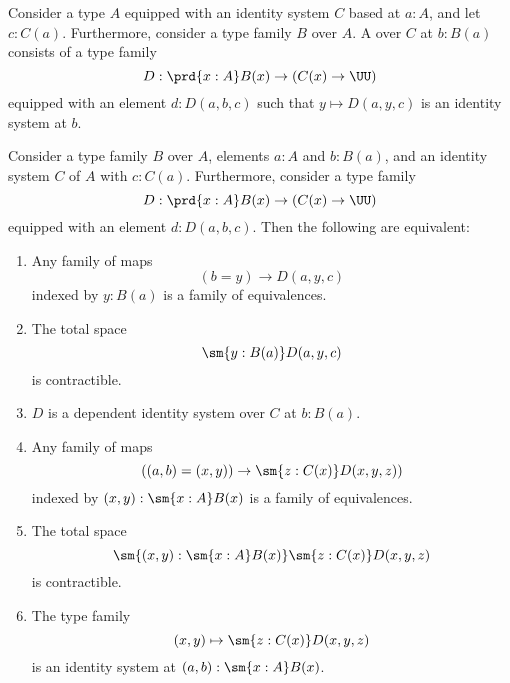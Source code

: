 \begin{defn}
  Consider a type $A$ equipped with an identity system $C$ based at $a:A$, and let $c:C(a)$. Furthermore, consider a type family $B$ over $A$. A  over $C$ at $b:B(a)$ consists of a type family
  \begin{equation*}
    D : \prd{x:A} B(x) \to (C(x)\to \UU)
  \end{equation*}
  equipped with an element $d:D(a,b,c)$ such that $y\mapsto D(a,y,c)$ is an identity system at $b$.
\end{defn}

\begin{thm}\label{thm:structure-identity-principle}
  Consider a type family $B$ over $A$, elements $a:A$ and $b:B(a)$, and an identity system $C$ of $A$ with $c:C(a)$. Furthermore, consider a type family
  \begin{equation*}
    D : \prd{x:A} B(x) \to (C(x)\to \UU)
  \end{equation*}
  equipped with an element $d:D(a,b,c)$. Then the following are equivalent:
  \begin{enumerate}
  \item Any family of maps
    \begin{equation*}
      (b=y)\to D(a,y,c)
    \end{equation*}
    indexed by $y:B(a)$ is a family of equivalences.
  \item The total space
    \begin{equation*}
      \sm{y:B(a)}D(a,y,c)
    \end{equation*}
    is contractible.
  \item $D$ is a dependent identity system over $C$ at $b:B(a)$.
  \item Any family of maps
    \begin{equation*}
      ((a,b)=(x,y))\to \sm{z:C(x)}D(x,y,z))
    \end{equation*}
    indexed by $(x,y):\sm{x:A}B(x)$ is a family of equivalences.
  \item The total space
    \begin{equation*}
      \sm{(x,y):\sm{x:A}B(x)}\sm{z:C(x)}D(x,y,z)
    \end{equation*}
    is contractible.
  \item The type family
    \begin{equation*}
      (x,y)\mapsto \sm{z:C(x)}D(x,y,z)
    \end{equation*}
    is an identity system at $(a,b):\sm{x:A}B(x)$.
  \end{enumerate}
\end{thm}

